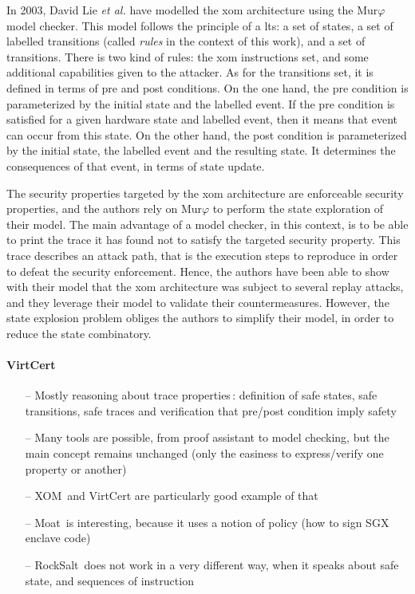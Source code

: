 In 2003, David Lie \emph{et al.} have modelled the \ac{xom} architecture using
the Mur$\varphi$ model checker.
%
This model follows the principle of a \ac{lts}: a set of states, a set of
labelled transitions (called \emph{rules} in the context of this work), and a
set of transitions.
%
There is two kind of rules: the \ac{xom} instructions set, and some additional
capabilities given to the attacker.
%
As for the transitions set, it is defined in terms of pre and post conditions.
%
On the one hand, the pre condition is parameterized by the initial state and the
labelled event.
%
If the pre condition is satisfied for a given hardware state and labelled event,
then it means that event can occur from this state.
%
On the other hand, the post condition is parameterized by the initial state, the
labelled event and the resulting state.
%
It determines the consequences of that event, in terms of state update.

The security properties targeted by the \ac{xom} architecture are enforceable
security properties, and the authors rely on Mur$\varphi$ to perform the state
exploration of their model.
%
The main advantage of a model checker, in this context, is to be able to print the
trace it has found not to satisfy the targeted security property.
%
This trace describes an attack path, that is the execution steps to reproduce in
order to defeat the security enforcement.
%
Hence, the authors have been able to show with their model that the \ac{xom}
architecture was subject to several replay attacks, and they leverage their
model to validate their countermeasures.
%
However, the state explosion problem obliges the authors to simplify their
model, in order to reduce the state combinatory.

\paragraph{VirtCert}
%

\begin{itemize}
\item[--] Mostly reasoning about trace
  properties\,\cite{schneider2000enforceable}: definition of safe states, safe
  transitions, safe traces and verification that pre/post condition imply safety
\item[--] Many tools are possible, from proof assistant to model checking, but
  the main concept remains unchanged (only the easiness to express/verify one
  property or another)
\item[--] XOM\,\cite{lie2003xom} and VirtCert are particularly good example of
  that
\item[--] Moat\,\cite{sinha2015moat} is interesting, because it uses a notion of
  policy (how to sign SGX enclave code)
\item[--] RockSalt\,\cite{morrisett2012rocksalt} does not work in a very
  different way, when it speaks about safe state, and sequences of instruction
\end{itemize}


